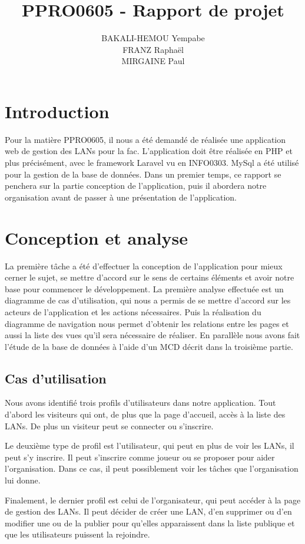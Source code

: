\documentclass[12pt]{article}
\title{\textbf{PPRO0605 - Rapport de projet}}
\author{
		BAKALI-HEMOU Yempabe\\
		FRANZ Raphaël\\
		MIRGAINE Paul
		}
\date{}
\begin{document}


\section*{Introduction}

Pour la matière PPRO0605, il nous a été demandé de réalisée une application web de gestion des LANs pour la fac. L'application doit être réalisée en PHP et plus précisément, avec le framework Laravel vu en INFO0303. MySql a été utilisé pour la gestion de la base de données. Dans un premier temps, ce rapport se penchera sur la partie conception de l'application, puis il abordera notre organisation avant de passer à une présentation de l'application.
\tableofcontents

\newpage

\section{Conception et analyse}
La première tâche a été d'effectuer la conception de l'application pour mieux cerner le sujet, se mettre d'accord sur le sens de certains éléments et avoir notre base pour commencer le développement. La première analyse effectuée est un diagramme de cas d'utilisation, qui nous a permis de se mettre d'accord sur les acteurs de l'application et les actions nécessaires. Puis la réalisation du diagramme de navigation nous permet d'obtenir les relations entre les pages et aussi la liste des vues qu'il sera nécessaire de réaliser. En parallèle nous avons fait l'étude de la base de données à l'aide d'un MCD décrit dans la troisième partie.
\subsection{Cas d'utilisation}

Nous avons identifié trois profils d'utilisateurs dans notre application. Tout d'abord les visiteurs qui ont, de plus que la page d'accueil, accès à la liste des LANs. De plus un visiteur peut se connecter ou s'inscrire.
\newline

Le deuxième type de profil est l'utilisateur, qui peut en plus de voir les LANs, il peut s'y inscrire. Il peut s'inscrire comme joueur ou se proposer pour aider l'organisation. Dans ce cas, il peut possiblement voir les tâches que l'organisation lui donne.
\newline

Finalement, le dernier profil est celui de l'organisateur, qui peut accéder à la page de gestion des LANs. Il peut décider de créer une LAN, d'en supprimer ou d'en modifier une ou de la publier pour qu'elles apparaissent dans la liste publique et que les utilisateurs puissent la rejoindre.
\newline
\end{document}
